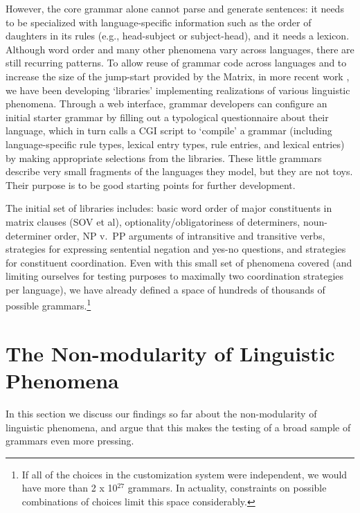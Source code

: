 \documentclass[11pt]{article}
\begin{document}
However, the core grammar alone cannot parse and generate sentences:
it needs to be specialized with language-specific information such as
the order of daughters in its rules (e.g., head-subject or
subject-head), and it needs a lexicon.  Although word order and many
other phenomena vary across languages, there are still recurring
patterns.  To allow reuse of grammar code across languages and to
increase the size of the jump-start provided by the Matrix, in more
recent work \cite{Ben:Fli:05,Dre:Ben:05}, we have been developing
`libraries' implementing realizations of various linguistic phenomena.
Through a web interface, grammar developers can configure an initial
starter grammar by filling out a typological questionnaire about their
language, which in turn calls a CGI script to `compile' a grammar
(including language-specific rule types, lexical entry types, rule
entries, and lexical entries) by making appropriate selections from
the libraries. These little grammars describe very small fragments of
the languages they model, but they are not toys.  Their purpose is to
be good starting points for further development.

The initial set of libraries includes: basic word order of major
constituents in matrix clauses (SOV et al), optionality/obligatoriness
of determiners, noun-determiner order, NP v.\ PP arguments of
intransitive and transitive verbs, strategies for expressing
sentential negation and yes-no questions, and strategies for
constituent coordination.  Even with this small set of phenomena
covered (and limiting ourselves for testing purposes to 
maximally two coordination strategies per language), we have already
defined a space of hundreds of thousands of possible
grammars.\footnote{If all of the choices in the customization system
were independent, we would have more than 2 x 10$^{27}$ grammars.  In
actuality, constraints on possible combinations of choices limit this space considerably.}

\section{The Non-modularity of Linguistic Phenomena}

In this section we discuss our findings so far about the
non-modularity of linguistic phenomena, and argue that this
makes the testing of a broad sample of grammars even more pressing.
\end{document}
